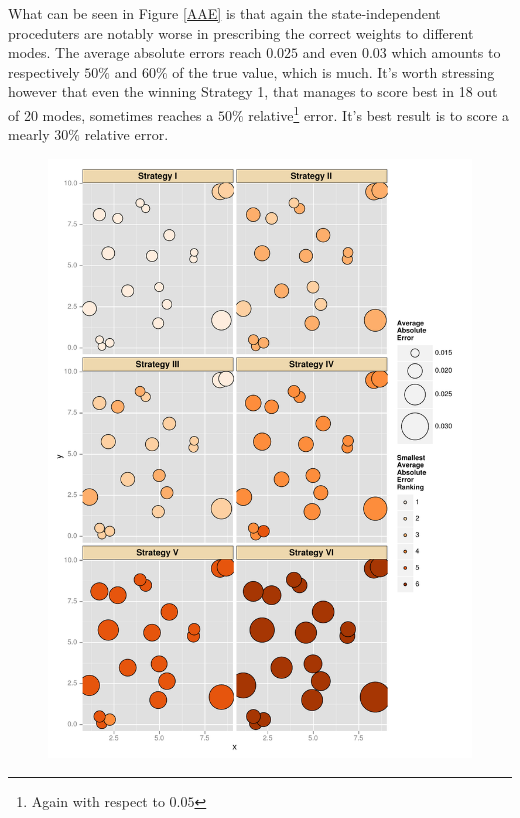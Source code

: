 \documentclass{book}
\begin{document}
What can be seen in Figure \ref{AAE} is that again the state-independent proceduters are notably worse in prescribing the correct weights to different modes. The average absolute errors reach $0.025$ and even $0.03$ which amounts to respectively $50\%$ and $60\%$ of the true value, which is much. It's worth stressing however that even the winning Strategy 1, that manages to score best in 18 out of 20 modes, sometimes reaches a $50\%$ relative\footnote{Again with respect to $0.05$} error. It's best result is to score a mearly $30\%$ relative error.         


\begin{figure}[ht]
	\centering \includegraphics[height=.7\textheight,keepaspectratio=TRUE]{./img/ggplotAverageAbsoluteError.pdf}
	\caption{
}
\end{figure}
\end{document}
